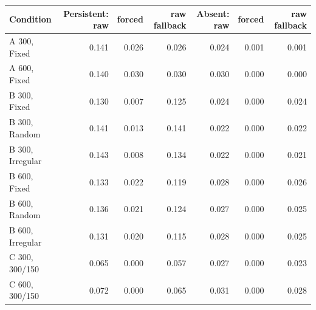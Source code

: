 \begin{tabular}{lrrrrrr}
\toprule
Condition & Persistent: raw & forced & raw fallback & Absent: raw & forced & raw fallback \\
\midrule
A 300, Fixed & 0.141 & 0.026 & 0.026 & 0.024 & 0.001 & 0.001 \\
A 600, Fixed & 0.140 & 0.030 & 0.030 & 0.030 & 0.000 & 0.000 \\
B 300, Fixed & 0.130 & 0.007 & 0.125 & 0.024 & 0.000 & 0.024 \\
B 300, Random & 0.141 & 0.013 & 0.141 & 0.022 & 0.000 & 0.022 \\
B 300, Irregular & 0.143 & 0.008 & 0.134 & 0.022 & 0.000 & 0.021 \\
B 600, Fixed & 0.133 & 0.022 & 0.119 & 0.028 & 0.000 & 0.026 \\
B 600, Random & 0.136 & 0.021 & 0.124 & 0.027 & 0.000 & 0.025 \\
B 600, Irregular & 0.131 & 0.020 & 0.115 & 0.028 & 0.000 & 0.025 \\
C 300, 300/150 & 0.065 & 0.000 & 0.057 & 0.027 & 0.000 & 0.023 \\
C 600, 300/150 & 0.072 & 0.000 & 0.065 & 0.031 & 0.000 & 0.028 \\
\bottomrule
\end{tabular}
